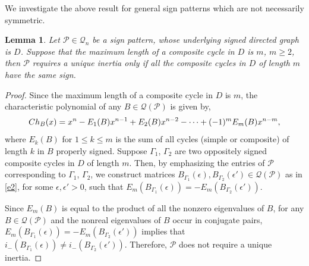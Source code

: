 \documentclass[10pt,a4paper]{amsart}
\newtheorem{lemma}{Lemma}[section]
\numberwithin{equation}{section}
\def\Ch{{\rm Ch}}
\begin{document}
	
	We investigate the above result for general sign patterns which are not necessarily symmetric.
	
	\begin{lemma}\label{xnl1}
		Let $\mathcal{P}\in \mathcal{Q}_n$ be a sign pattern, whose underlying signed directed graph is $D$. Suppose that the maximum length of a composite cycle in $D$ is $m$, $m\geq 2$, then $\mathcal{P}$ requires a unique inertia only if all the composite cycles in $D$ of length $m$ have the same sign.
	\end{lemma}
	\begin{proof}
		Since the maximum length of a composite cycle in $D$ is $m$, the characteristic polynomial of any $B\in \mathcal{Q}(\mathcal{P})$ is given by, 
		$$\Ch_B(x)=x^n-E_1(B)x^{n-1}+E_2(B)x^{n-2}-\cdots+(-1)^mE_m(B)x^{n-m},$$
		where $E_k(B)$ for $1\leq k\leq m$ is the sum of all cycles (simple or composite) of length $k$ in $B$ properly signed. Suppose $\Gamma_1$, $\Gamma_2$ are two oppositely signed composite cycles in $D$ of length $m$. Then, by emphasizing the entries of $\mathcal{P}$ corresponding to $\Gamma_1$, $\Gamma_2$, we construct matrices $B_{\Gamma_1}(\epsilon), B_{\Gamma_2}(\epsilon') \in \mathcal{Q}(\mathcal{P})$ as in \ref{e2}, for some $\epsilon, \epsilon'>0$, such that $E_m(B_{\Gamma_1}(\epsilon))=-E_m(B_{\Gamma_2}(\epsilon'))$.
		
		Since $E_m(B)$ is equal to the product of all the nonzero eigenvalues of $B$, for any $B\in \mathcal{Q}(\mathcal{P})$ and the nonreal eigenvalues of $B$ occur in conjugate pairs, $E_m(B_{\Gamma_1}(\epsilon))=-E_m(B_{\Gamma_2}(\epsilon'))$ implies that $i_-(B_{\Gamma_1}(\epsilon))\neq i_-(B_{\Gamma_2}(\epsilon'))$. Therefore, $\mathcal{P}$ does not require a unique inertia.
	\end{proof}
	
\end{document}
